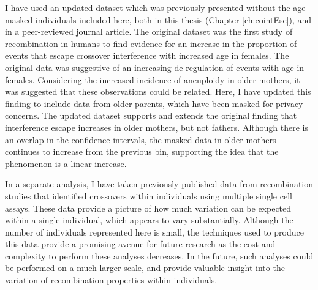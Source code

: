 I have used an updated dataset which was previously presented without the age-masked individuals included here, both in this thesis (Chapter \ref{ch:cointEsc}), and in a peer-reviewed journal article\cite{Campbell2015}.
The original dataset was the first study of recombination in humans to find evidence for an increase in the proportion of events that escape crossover interference with increased age in females.
The original data was suggestive of an increasing de-regulation of events with age in females.
Considering the increased incidence of aneuploidy in older mothers\cite{Hassold2001}, it was suggested that these observations could be related.
Here, I have updated this finding to include data from older parents, which have been masked for privacy concerns.
The updated dataset supports and extends the original finding that interference escape increases in older mothers, but not fathers.
Although there is an overlap in the confidence intervals, the masked data in older mothers continues to increase from the previous bin, supporting the idea that the phenomenon is a linear increase.

In a separate analysis, I have taken previously published data from recombination studies that identified crossovers within individuals using multiple single cell assays.
These data provide a picture of how much variation can be expected within a single individual, which appears to vary substantially.
Although the number of individuals represented here is small, the techniques used to produce this data provide a promising avenue for future research as the cost and complexity to perform these analyses decreases.
In the future, such analyses could be performed on a much larger scale, and provide valuable insight into the variation of recombination properties within individuals.

\clearpage
\renewcommand{\bibname}{References}

\begingroup
    \setlength{\bibsep}{10pt}
    \linespread{1}\selectfont
    
\endgroup



